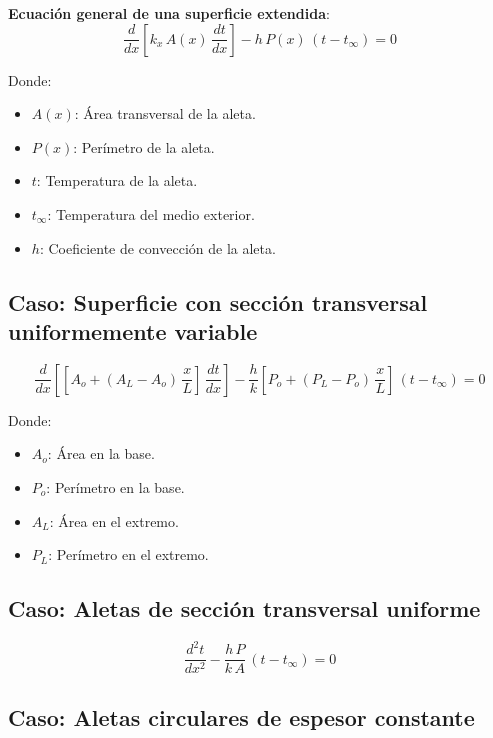 \textbf{Ecuación general de una superficie extendida}:
\begin{equation}
    \frac{d}{dx}\left[k_x\,A(x)\,\frac{dt}{dx}\right] - h\,P(x)\,(t-t_{\infty}) = 0
\end{equation}

Donde:
\begin{itemize}
    \item $A(x)$: Área transversal de la aleta.
    \item $P(x)$: Perímetro de la aleta.
    \item $t$: Temperatura de la aleta.
    \item $t_{\infty}$: Temperatura del medio exterior.
    \item $h$: Coeficiente de convección de la aleta.
\end{itemize}

\subsection{Caso: Superficie con sección transversal uniformemente variable}


\begin{equation}
    \frac{d}{dx}\left[\left[A_o + (A_L - A_o)\,\frac{x}{L}\right]\,\frac{dt}{dx}\right] - \frac{h}{k}\left[P_o + (P_L - P_o)\,\frac{x}{L}\right]\,(t - t_{\infty}) = 0
\end{equation}

Donde:
\begin{itemize}
    \item $A_o$: Área en la base.
    \item $P_o$: Perímetro en la base.
    \item $A_L$: Área en el extremo.
    \item $P_L$: Perímetro en el extremo.
\end{itemize}

\subsection{Caso: Aletas de sección transversal uniforme}


\begin{equation}
    \frac{d^2 t}{dx^2} - \frac{h\,P}{k\,A}\,(t - t_{\infty}) = 0
\end{equation}

\subsection{Caso: Aletas circulares de espesor constante}

